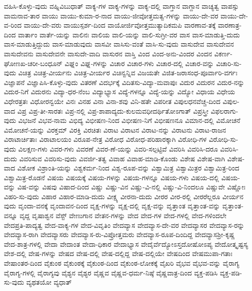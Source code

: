 {ವಹಿಸಿ-ಕೊಳ್ಳು-ವುದು
ವಹ್ನಿವಿಬುಧಾತ್
ವಾಕ್ಯ-ಗಳ
ವಾಕ್ಯ-ಗಳನ್ನು
ವಾಕ್ಯ-ದಲ್ಲಿ
ವಾಗ್ತಾನ
ವಾಗ್ದಾನ
ವಾಚ್ಯತ್ವ
ವಾಪಸ್ಸು
ವಾಮನಾವ-ತಾರ
ವಾಯು
ವಾಯು-ಕುಮಾ-ರ-ನಾದ
ವಾಯು-ಜೀವೋತ್ತಮತ್ವ-ಗಳನ್ನು
ವಾಯು-ದೇ-ವರ
ವಾಯು-ದೇ-ವ-ರಿಂದ
ವಾಯು-ದೇ-ವರು
ವಾಯುಸ್ಪರ್ಶ-ದಿಂದ
ವಾಯೋರ್ಜಿವೋತ್ತಮುತ್ಯಾದಿಕಮಪಿ
ವಾರಣಾವ-ತಕ್ಕೆ
ವಾರಣಾತ್ರ-ದಿಂದ
ವಾರ್ತಾಂ
ವಾರ್ತೆ-ಯನ್ನು
ವಾಲಿನಃ
ವಾಲಿಯ
ವಾಲಿ-ಯನ್ನು
ವಾಲಿ-ಸುಗ್ರೀ-ವರ
ವಾಸ
ವಾಸ-ಮಾಡುತ್ತಿ-ದುದು
ವಾಸ-ಮಾಡುತ್ತಿದ್ದುದು
ವಾಸ-ಮಾಡುವುದು
ವಾಸವೀ
ವಾಸಿಸು-ವಂತೆ
ವಾಸಿ-ಸು-ವುದು
ವಾಸುದೇವ
ವಾಸುದೇವನ
ವಾಸುದೇವನು
ವಾಸುದೇವನೇ
ವಾಸುದೇ-ವಾದಿ
ವಾಸುರನ
ವಾಸ್ತಿ
ವಿಂದ
ವಿಂದ-ಅನು-ವಿಂದರ
ವಿಂದನ
ವಿಕರ್ಣ-ಘೋಣಖ-ಚರೀ-ಬಂಧೂನ್
ವಿಘ್ನಂ
ವಿಘ್ನ-ಗಳನ್ನು
ವಿಚಾರ
ವಿಚಾರ-ಗಳು
ವಿಚಾರ-ದಲ್ಲಿ
ವಿಚಾರ-ವನ್ನು
ವಿಚಾರಿ-ಸು-ವುದು
ವಿಚಿತ್ರ
ವಿಚಿತ್ರ-ವೀರ್ಯನು
ವಿಚಿತ್ರ-ವೀರ್ಯರ
ವಿಚಿನ್ವನ್ನಿವ
ವಿಜಯತೇ
ವಿಜಿತ-ಜರಾಸಂಧ-ಪೂರ್ವಾರಿ-ವರ್ಗಃ
ವಿಜ್ಞಾಪನೆ
ವಿಜ್ಞಾಪಿಸಿ-ಕೊಳ್ಳು-ವುದು
ವಿತರಣೆ
ವಿದರ್ಭಕ್ಕೆ
ವಿದಿತಸು-ವಿದ್ಯಾ-ಮವಾಪುಃ
ವಿದುರ
ವಿದುರನ
ವಿದುರ-ನನ್ನು
ವಿದುರ-ನಿಗೆ
ವಿದುರನು
ವಿದ್ಯಾ-ಧರ-ನೆಂಬ
ವಿದ್ಯಾಭ್ಯಾಸ
ವಿದ್ಯೆ-ಗಳನ್ನೂ
ವಿದ್ಯೆ-ಯನ್ನು
ವಿದ್ಯೋ
ವಿಧಾಯ
ವಿಧೇಯ
ವಿಧೇರತ್ರತಃ
ವಿಧೋರನ್ವಯೇ
ವಿನಃ
ವಿನಹ
ವಿನಾ
ವಿನಾ-ಶವು
ವಿನಿ-ಹತೇ
ವಿಪರೀತ
ವಿಪುಲಧನವೆಚ್ಚ-ದಿಂದ
ವಿಪುಲ-ವಾದ
ವಿಪ್ರ
ವಿಪ್ರ-ತೀ-ಸಾರತಃ
ವಿಪ್ರ-ನಲ್ಲಿ
ವಿಪ್ರ-ಶಾಪಾದ್ಯದು-ಕುಲಮವಧೀದರ್ಥಿತೋಽಗಾತ್
ವಿಪ್ರಸ್ತ್ರೀ
ವಿಫಲರಾಗು-ವುದು
ವಿಭಜನೆ
ವಿಭವ-ನಾಮ
ವಿಭಿದ್ಯ
ವಿಭೀಷಣ-ನಿಂದ
ವಿಭೀಷಣ-ನಿಗೆ
ವಿಭೀಷಣನೂ
ವಿಮಾನ-ದಲ್ಲಿ
ವಿಮೋಚನೆ
ವಿಮೋಚನೆ-ಯನ್ನು
ವಿರಕ್ತಮ್
ವಿರಕ್ತಿ
ವಿರಚಿತಃ
ವಿರಾಟ
ವಿರಾಟನ
ವಿರಾಟ-ನನ್ನು
ವಿರಾಟನು
ವಿರಾಟ-ರಾಜನ
ವಿರಾಟಾರ್ಚಿತಾಃ
ವಿರಾಟಾಲಯಂ
ವಿರೂಪ-ನೇತ್ರ
ವಿರೋಧ
ವಿರೋಧ-ಪರಿಹಾರಕ್ಕಾಗಿ
ವಿರೋಧಿ-ಗಳ
ವಿರೋಧಿ-ಸು-ವುದು
ವಿಲಕ್ಷಣ-ಗಳು
ವಿವರ-ಗಳು
ವಿವರಣೆ
ವಿವರ-ಣೆ-ಯನ್ನು
ವಿವರಿ-ಸಲ್ಪಟ್ಟಿವೆ
ವಿವರಿಸಿ
ವಿವರಿಸಿ-ದರೂ
ವಿವರಿಸಿ-ದುದು
ವಿವರಿಸುವ
ವಿವರಿಸು-ವುದು
ವಿವರ್ಜಿ-ತತ್ವ
ವಿವಾಹ
ವಿವಾಹ-ಮಾಡಿ-ಕೊಂಡು
ವಿಶೇಷ
ವಿಶೇಷ-ವಾಗಿ
ವಿಶೇಷ-ವಾದ
ವಿಶೋಕ
ವಿಶ್ರಾಂತಿ-ಯನ್ನು
ವಿಶ್ವಕರ್ಮ-ನಿಂದ
ವಿಶ್ವ-ರೂಪ-ವನ್ನು
ವಿಶ್ವಾಮಿತ್ರ
ವಿಶ್ವಾಮಿತ್ರರ
ವಿಶ್ವಾಮಿತ್ರ-ರಿಂದ
ವಿಶ್ವಾಮಿತ್ರ-ರೊಡನೆ
ವಿಷಯ
ವಿಷಯಕ್ಕೆ
ವಿಷಯ-ಗಳನ್ನು
ವಿಷಯ-ಗಳನ್ನೂ
ವಿಷಯ-ಗಳು
ವಿಷಯ-ದಲ್ಲಿ
ವಿಷಯ-ವನ್ನು
ವಿಷ-ವನ್ನು
ವಿಷವು
ವಿಷಾದ-ದಿಂದ
ವಿಷ್ಣು
ವಿಷ್ಣು-ವಿನ
ವಿಷ್ಣು-ವಿ-ನಲ್ಲಿ
ವಿಷ್ಣು-ವಿ-ನಿಂದಲೂ
ವಿಷ್ಣುವೇ
ವಿಷ್ಣೋಃ
ವಿಹರಿ-ಸು-ವುದು
ವಿಹಾರ
ವಿಹಾರ-ಮಾಡಿ-ದುದು
ವೀಕ್ಷ್ಯ
ವೀರನಾ-ದುದು
ವೀರರ
ವೀರ-ರಲ್ಲಿ
ವೀರರೆಲ್ಲರೂ
ವೀರ್ಯನ
ವುದು
ವೃಂದಾ-ವನಕ್ಕೆ
ವೃಂದಾವನ-ದಿಂದ
ವೃಕ್ಷ-ಗಳನ್ನು
ವೃಕ್ಷ-ದಲ್ಲಿ
ವೃಕ್ಷ-ವನ್ನು
ವೃತ್ತಾಂತ
ವೃತ್ತಾಂತ-ವನ್ನು
ವೃತ್ತಾಂತ-ವನ್ನೂ
ವೃದ್ದ
ವೃಷಾಶ್ವನ
ವೆಸ್ಟ್
ವೇಣುಗಾನ
ವೇತನ-ಗಳನ್ನು
ವೇದ
ವೇದ-ಗಳ
ವೇದ-ಗಳಲ್ಲಿ
ವೇದ-ಗಳಿಂದಲೇ
ವೇದಪ್ರತಿ-ಪಾದ್ಯತ್ವ
ವೇದ-ವಾಕ್ಯ-ಗಳ
ವೇದ-ವಿವೃತಿಂ
ವೇದವ್ಯಾಸ
ವೇದವ್ಯಾಸ-ದೇ-ವರ
ವೇದವ್ಯಾಸರ
ವೇದವ್ಯಾಸ-ರನ್ನು
ವೇದವ್ಯಾಸ-ರಾಗಿ
ವೇದವ್ಯಾಸರು
ವೇದವ್ಯಾಸ-ರು-ವಿಪ್ರೋತ್ತಮರು
ವೇದವ್ಯಾಸ-ರೂಪ-ದಿಂದಿದ್ದ
ವೇದವ್ಯಾಸಶ್ರೀ-ಕೃಷ್ಣ
ವೇದ-ಶಾತ್ರ-ಗಳಲ್ಲಿ
ವೇದಾ
ವೇದಾಂತ
ವೇದಾ-ಧಿಕಾರ
ವೇದಾಭ್ಯಾಸ
ವೇದೈರ್ವೆದ್ಯೋಽಸ್ತದೋಷೋಽಪ್ಯ
ವೇದೋತ್ಕೃಷ್ಟಸ್ಯ
ವೇಶ-ದಲ್ಲಿ
ವೇಷ-ಗಳನ್ನು
ವೇಷದ
ವೇಷ-ದಲ್ಲಿ
ವೇಷ-ದಲ್ಲಿದ್ದ
ವೇಷ-ದಲ್ಲಿಯೇ
ವೇಷದಿಂದ
ವೇಷಮುಪಾ-ಗತಾಃ
ವೇಷಾಂತರ-ದಿಂದ
ವೈಕುಂಠ
ವೈಕುಂಠಕ್ಕೆ
ವೈಕುಂಠ-ದಿಂದ
ವೈಕುಂಠ-ಲೋಕಕ್ಕೆ
ವೈಖರಿ
ವೈಭವ
ವೈಭವ-ವನ್ನು
ವೈರಾಗ್ಯ
ವೈರಾಗ್ಯ-ಗಳಲ್ಲಿ
ವೈರಾಗ್ಯವು
ವೈಶ್ಯನ
ವೈಶ್ಯರ
ವೈಷ್ಣವ
ವೈಷ್ಣವ-ಧರ್ಮ-ನಿಷ್ಠೆ
ವೈಷ್ಣವಾತ್ರ-ದಿಂದ
ವ್ಯಕ್ತ-ಪಡಿಸಿ
ವ್ಯಕ್ತ-ಪಡಿ-ಸು-ವುದು
ವ್ಯಥತಯೋ
ವ್ಯಧಾತ್‌
}
